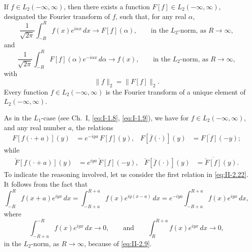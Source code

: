 \begin{theorem}[Plancherel]\label{thm:II-1}
If $f\in L_{2}(-\infty,\infty)$, then there exists a function $F[f]\in L_{2}(-\infty,\infty)$, designated the Fourier transform of $f$, such that, for any real $\alpha$,
\begin{equation}\tag{2.19}\label{eq:II-2.19}
\frac{1}{\sqrt{2\pi}}\int_{-R}^{R}f(x)e^{i\alpha x}\,dx\to F[f](\alpha),\qquad\text{in the $L_{2}$-norm, as $R\to\infty$},
\end{equation}
and
\begin{equation}\tag{2.20}\label{eq:II-2.20}
\frac{1}{\sqrt{2\pi}}\int_{-R}^{R}F[f](\alpha)e^{-i\alpha x}\,d\alpha\to f(x),\qquad\text{in the $L_{2}$-norm, as $R\to\infty$},
\end{equation}
with
\begin{equation}\tag{2.21}\label{eq:II-2.21}
\|f\|_{2}=\|F[f]\|_{2}.
\end{equation}
Every function $f\in L_{2}(-\infty,\infty)$ is the Fourier transform of a unique element of $L_{2}(-\infty,\infty)$.
\end{theorem}

As in the $L_{1}$-case (see Ch.~I, \eqref{eq:I-1.8}, \eqref{eq:I-1.9}), we have for $f\in L_{2}(-\infty,\infty)$, and any real number $a$, the relations
\begin{align}\tag{2.22}\label{eq:II-2.22}
F[f(\cdot+a)](y)&=e^{-iya}\,F[f](y), & F[\overline{f}(\cdot)](y)&=\overline{F[f]}(-y);
\end{align}
while
\begin{align}\tag{2.23}\label{eq:II-2.23}
\check F[f(\cdot+a)](y)&=e^{iya}\,\check F[f](-y), & \check F[\overline{f}(\cdot)](y)&=\overline{\check F[f]}(y).
\end{align}
To indicate the reasoning involved, let us consider the first relation in \eqref{eq:II-2.22}. It follows from the fact that
\[
\int_{-R}^{R}f(x+a)e^{iyx}\,dx
=\int_{-R+a}^{R+a}f(x)e^{iy(x-a)}\,dx
=e^{-iya}\int_{-R+a}^{R+a}f(x)e^{iyx}\,dx,
\]
where
\[
\int_{-R+a}^{-R}f(x)e^{iyx}\,dx\to 0,\qquad\text{and}\qquad
\int_{R}^{R+a}f(x)e^{iyx}\,dx\to 0,
\]
in the $L_{2}$-norm, as $R\to\infty$, because of \eqref{eq:II-2.9}.


